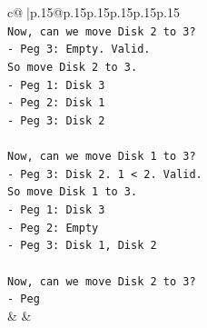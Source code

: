 \documentclass{article}
\begin{document}
{\begin{supertabular}{c@{$\;$}|p{.15\linewidth}@{}p{.15\linewidth}p{.15\linewidth}p{.15\linewidth}p{.15\linewidth}p{.15\linewidth}}
{{{\\ 
\texttt{Now, can we move Disk 2 to 3?} \\
\texttt{{-} Peg 3: Empty. Valid.} \\
\texttt{So move Disk 2 to 3.} \\
\texttt{{-} Peg 1: Disk 3} \\
\texttt{{-} Peg 2: Disk 1} \\
\texttt{{-} Peg 3: Disk 2} \\
\\ 
\texttt{Now, can we move Disk 1 to 3?} \\
\texttt{{-} Peg 3: Disk 2. 1 < 2. Valid.} \\
\texttt{So move Disk 1 to 3.} \\
\texttt{{-} Peg 1: Disk 3} \\
\texttt{{-} Peg 2: Empty} \\
\texttt{{-} Peg 3: Disk 1, Disk 2} \\
\\ 
\texttt{Now, can we move Disk 2 to 3?} \\
\texttt{{-} Peg} \\
            }
        }
    }
    & & \\ \\


\end{supertabular}}
\end{document}
